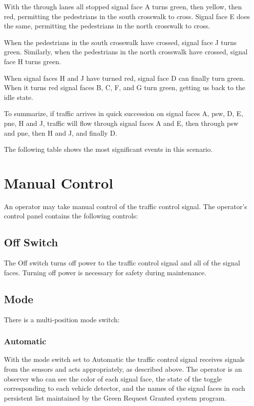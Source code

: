 \documentclass[letterpaper,twoside]{article}
\begin{document}
With the through lanes all stopped signal face A turns
green, then yellow, then red, permitting the pedestrians in the south
crosswalk to cross.  Signal face E does the same, permitting the
pedestrians in the north crosswalk to cross.

When the pedestrians in the south crosswalk have crossed, signal
face J turns green.  Similarly, when the pedestrians in the
north crosswalk have crossed, signal face H turns green.

When signal faces H and J have turned red, signal face D
can finally turn green.  When it turns red signal faces
B, C, F, and G turn green, getting us back to the idle state.

To summarize, if traffic arrives in quick succession on signal faces
A, psw, D, E, pne, H and J, traffic will flow through signal faces
A and E, then through psw and pne, then H and J, and finally D.

The following table shows the most significant events in this scenario.



\section{Manual Control}

An operator may take manual control of the traffic control signal.
The operator's control panel contains the following controls:

\subsection{Off Switch}
The Off switch turns off power to the traffic control signal and all
of the signal faces.  Turning off power is necessary for safety during
maintenance.

\subsection{Mode}

There is a multi-position mode switch:

\subsubsection{Automatic}

With the mode switch set to Automatic the traffic control signal
receives signals from the sensors and acts appropriately, as described
above.  The operator is an observer who can see the color of each
signal face, the state of the toggle corresponding to each vehicle detector,
and the names of the signal faces in each persistent list maintained by
the Green Request Granted system program.
\end{document}
